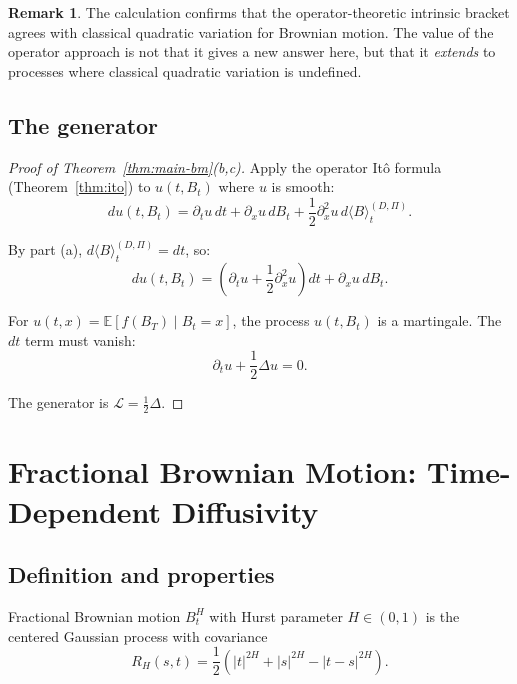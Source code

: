 \documentclass[11pt]{article}
\theoremstyle{definition}
\newtheorem{remark}[theorem]{Remark}
\newcommand{\E}{\mathbb{E}}
\begin{document}
\begin{remark}
The calculation confirms that the operator-theoretic intrinsic bracket agrees with classical quadratic variation for Brownian motion. The value of the operator approach is not that it gives a new answer here, but that it \emph{extends} to processes where classical quadratic variation is undefined.
\end{remark}

\subsection{The generator}

\begin{proof}[Proof of Theorem~\ref{thm:main-bm}(b,c)]
Apply the operator It\^o formula (Theorem~\ref{thm:ito}) to $u(t, B_t)$ where $u$ is smooth:
\begin{equation}
du(t, B_t) = \partial_t u \, dt + \partial_x u \, dB_t + \frac{1}{2}\partial_x^2 u \, d\langle B \rangle^{(D,\Pi)}_t.
\end{equation}

By part (a), $d\langle B \rangle^{(D,\Pi)}_t = dt$, so:
\begin{equation}
du(t, B_t) = \left(\partial_t u + \frac{1}{2}\partial_x^2 u\right) dt + \partial_x u \, dB_t.
\end{equation}

For $u(t,x) = \E[f(B_T) \mid B_t = x]$, the process $u(t, B_t)$ is a martingale. The $dt$ term must vanish:
\begin{equation}
\partial_t u + \frac{1}{2}\Delta u = 0.
\end{equation}

The generator is $\mathcal{L} = \frac{1}{2}\Delta$.
\end{proof}

\section{Fractional Brownian Motion: Time-Dependent Diffusivity}\label{sec:fbm}

\subsection{Definition and properties}

Fractional Brownian motion $B^H_t$ with Hurst parameter $H \in (0,1)$ is the centered Gaussian process with covariance
\begin{equation}
R_H(s,t) = \frac{1}{2}\left(|t|^{2H} + |s|^{2H} - |t-s|^{2H}\right).
\end{equation}
\end{document}
